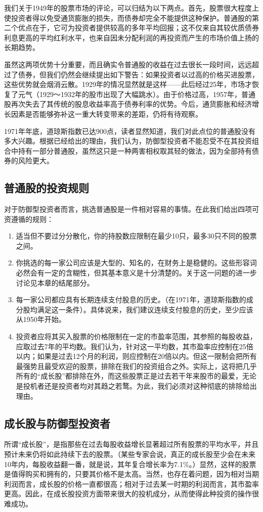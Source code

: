 \documentclass[12pt,oneside]{book}
\begin{document}
我们关于1949年的股票市场的评论，可以归结为以下两点。首先，股票很大程度上使投资者得以免受通货膨胀的损失，而债券却完全不能提供这种保护。普通股的第二个优点在于，它可为投资者提供较高的多年平均回报；这不仅来自其较优质债券利息更高的平均红利水平，也来自因未分配利润的再投资而产生的市场价值上扬的长期趋势。

虽然这两项优势十分重要，而且确实令普通股的收益在过去很长一段时间，远远超过了债券，但我们仍然会继续提出如下警告：如果投资者以过高的价格买进股票，这些优势就会烟消云散。1929年的情况显然就是这样——此后经过25年，市场才恢复了元气（1929～1932年的股市出现了大幅跳水）。由于价格过高，1957年，普通股再次失去了其传统的股息收益率高于债券利率的优势。今后，通货膨胀和经济增长因素是否能够弥补这一重大转变带来的差距，仍将有待观察。

1971年年底，道琼斯指数已达900点，读者显然知道，我们对此点位的普通股没有多大兴趣。根据已经给出的理由，我们认为，防御型投资者不能忍受不在其投资组合中持有一部分普通股，虽然这只是一种两害相权取其轻的做法，因为全部持有债券的风险更大。

\subsection{普通股的投资规则}
对于防御型投资者而言，挑选普通股是一件相对容易的事情。在此我们给出四项可资遵循的规则：

\begin{enumerate}
\item 适当但不要过分分散化，你的持股数应限制在最少10只，最多30只不同的股票之间。
\item 你挑选的每一家公司应该是大型的、知名的，在财务上是稳健的。这些形容词必然会有一定的含糊性，但其基本意义是十分清楚的。关于这一问题的进一步讨论见本章的结尾部分。
\item 每一家公司都应具有长期连续支付股息的历史。（在1971年，道琼斯指数的成分股均满足这一条件）。具体说来，我们建议连续支付股息的历史，至少应该从1950年开始。
\item 投资者应将其买入股票的价格限制在一定的市盈率范围，其参照的每股收益，应取过去7年的平均数。我们认为，针对这一平均数，其市盈率应控制在25倍以内；如果是过去12个月的利润，则应控制在20倍以内。但这一限制会把所有最强势且最受欢迎的股票，排除在我们的投资组合之外。实际上，这将把几乎所有的“成长股”都排除在外，而这些股票正是过去若干年来股市的最爱，无论是投机者还是投资者均对其趋之若鹜。为此，我们必须对这种彻底的排除给出理由。
\end{enumerate}



\subsection{成长股与防御型投资者}
所谓“成长股”，是指那些在过去每股收益增长显著超过所有股票的平均水平，并且预计未来仍将如此持续下去的股票。（某些专家会说，真正的成长股至少会在未来10年内，每股收益翻一番，就是说，其年复合增长率为7.1\%。）显然，这样的股票是值得购买和拥有的，只要其价格不是太高。当然，也存在着问题，因为相对当期利润而言，成长股的价格一直都很高；相对于过去某一时期的利润而言，其市盈率更高。因此，在成长股投资方面带来很大的投机成分，从而使得此种投资的操作很难成功。
\end{document}
